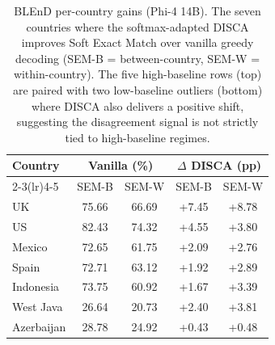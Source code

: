 \documentclass{article}
\providecommand{\gain}{}\renewcommand{\gain}[1]{\textcolor{improvegreen}{#1}}
\begin{document}
\begin{table}[H]\centering\small
\caption{BLEnD per-country gains (Phi-4 14B). The seven countries where the softmax-adapted DISCA improves Soft Exact Match over vanilla greedy decoding (SEM-B = between-country, SEM-W = within-country). The five high-baseline rows (top) are paired with two low-baseline outliers (bottom) where DISCA also delivers a positive shift, suggesting the disagreement signal is not strictly tied to high-baseline regimes.}
\label{tab:blend_wins}
\setlength{\tabcolsep}{6pt}
\begin{tabular}{lcccc}\toprule
Country  & \multicolumn{2}{c}{Vanilla (\%)} & \multicolumn{2}{c}{$\Delta$ DISCA (pp)} \\
\cmidrule(lr){2-3}\cmidrule(lr){4-5}
         & SEM-B & SEM-W & SEM-B & SEM-W \\\midrule
UK         & 75.66 & 66.69 & \gain{+7.45} & \gain{+8.78} \\
US         & 82.43 & 74.32 & \gain{+4.55} & \gain{+3.80} \\
Mexico     & 72.65 & 61.75 & \gain{+2.09} & \gain{+2.76} \\
Spain      & 72.71 & 63.12 & \gain{+1.92} & \gain{+2.89} \\
Indonesia  & 73.75 & 60.92 & \gain{+1.67} & \gain{+3.39} \\
\midrule
West Java  & 26.64 & 20.73 & \gain{+2.40} & \gain{+3.81} \\
Azerbaijan & 28.78 & 24.92 & \gain{+0.43} & \gain{+0.48} \\
\bottomrule
\end{tabular}
\end{table}
\end{document}
